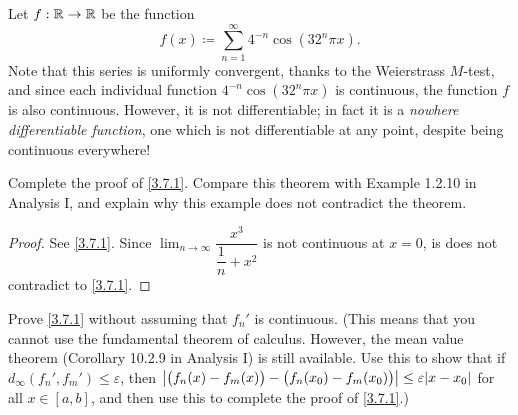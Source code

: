 \begin{eg}\label{3.7.4}
  Let \(f : \mathbb{R} \to \mathbb{R}\) be the function
  \[
    f(x) \coloneqq \sum_{n = 1}^\infty 4^{-n} \cos(32^n \pi x).
  \]
  Note that this series is uniformly convergent, thanks to the Weierstrass \(M\)-test, and since each individual function \(4^{-n} \cos(32^n \pi x)\) is continuous, the function \(f\) is also continuous.
  However, it is not differentiable;
  in fact it is a \emph{nowhere differentiable function}, one which is not differentiable at any point, despite being continuous everywhere!
\end{eg}

\exercisesection

\begin{ex}\label{ex:3.7.1}
  Complete the proof of \cref{3.7.1}.
  Compare this theorem with Example 1.2.10 in Analysis I, and explain why this example does not contradict the theorem.
\end{ex}

\begin{proof}
  See \cref{3.7.1}.
  Since \(\lim_{n \to \infty} \dfrac{x^3}{\dfrac{1}{n} + x^2}\) is not continuous at \(x = 0\), is does not contradict to \cref{3.7.1}.
\end{proof}

\begin{ex}\label{ex:3.7.2}
  Prove \cref{3.7.1} without assuming that \(f_n'\) is continuous.
  (This means that you cannot use the fundamental theorem of calculus.
  However, the mean value theorem (Corollary 10.2.9 in Analysis I) is still available.
  Use this to show that if \(d_\infty(f_n', f_m') \leq \varepsilon\), then \(\abs{\big(f_n(x) - f_m(x)\big) - \big(f_n(x_0) - f_m(x_0)\big)} \leq \varepsilon \abs{x - x_0}\) for all \(x \in [a, b]\), and then use this to complete the proof of \cref{3.7.1}.)
\end{ex}

